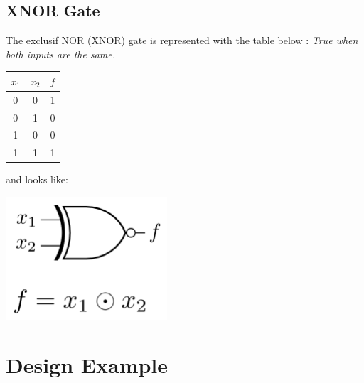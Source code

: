 \documentclass[12pt,openany, tikz,border=10pt]{book}
\begin{document}
\subsection{XNOR Gate}
The exclusif NOR (XNOR) gate is represented with the table below :
\textit{True when both inputs are the same.}
\vspace*{-10px}
\begin{table}[h]
    \centering
    \begin{tabular}{|c|c|c|}
    \hline
    \( x_1 \) & \( x_2 \) & \( f \) \\
    \hline
    
    0 & 0 & 1 \\
    0 & 1 & 0 \\
    1 & 0 & 0 \\
    1 & 1 & 1 \\
    \hline
    \end{tabular}
    \end{table}

    and looks like:
\begin{center}
    \begin{minipage}[c]{0.45\textwidth} %
        \centering
        \includegraphics[width=0.45\textwidth]{circuits/6.11.2.png} %
    \end{minipage}
\end{center}

\section{Design Example}
\end{document}
